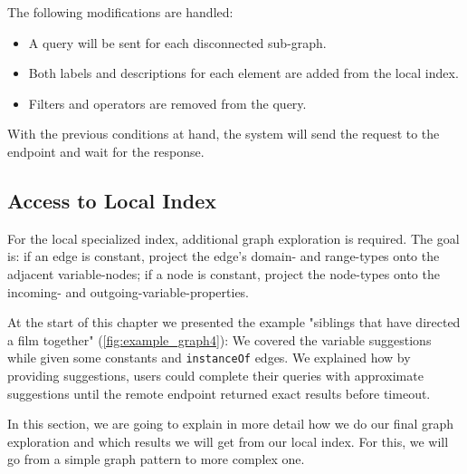 The following modifications are handled:
\begin{itemize}
    \item A query will be sent for each disconnected sub-graph.
    \item Both labels and descriptions for each element are added from the local index.
    \item Filters and operators are removed from the query.
\end{itemize}

With the previous conditions at hand, the system will send the request to the endpoint and wait for the response.

\subsection{Access to Local Index}

For the local specialized index, additional graph exploration is required. The goal is: if an edge is constant, project the edge's domain- and range-types onto the adjacent variable-nodes; if a node is constant, project the node-types onto the incoming- and outgoing-variable-properties.

At the start of this chapter we presented the example  "siblings that have directed a film together" (\autoref{fig:example_graph4}): We covered the variable suggestions while given some constants and \texttt{instanceOf} edges. We explained how by providing suggestions, users could complete their queries with approximate suggestions until the remote endpoint returned exact results before timeout. 

In this section, we are going to explain in more detail how we do our final graph exploration and which results we will get from our local index. For this, we will go from a simple graph pattern to more complex one.

